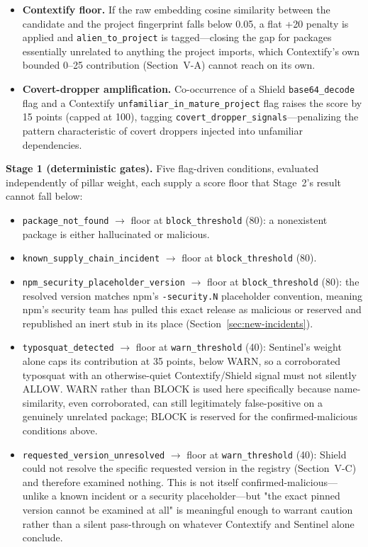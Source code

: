 \documentclass[journal]{IEEEtran}
\begin{document}
\begin{itemize}
\item \textbf{Contextify floor.} If the raw embedding cosine similarity between the candidate and the
project fingerprint falls below 0.05, a flat +20 penalty is applied and \texttt{alien\_to\_project} is
tagged---closing the gap for packages essentially unrelated to anything the project imports, which
Contextify's own bounded 0--25 contribution (Section~V-A) cannot reach on its own.
\item \textbf{Covert-dropper amplification.} Co-occurrence of a Shield \texttt{base64\_decode} flag and a
Contextify \texttt{unfamiliar\_in\_mature\_project} flag raises the score by 15 points (capped at 100),
tagging \texttt{covert\_dropper\_signals}---penalizing the pattern characteristic of covert droppers injected
into unfamiliar dependencies.
\end{itemize}

\textbf{Stage 1 (deterministic gates).} Five flag-driven conditions, evaluated independently of pillar
weight, each supply a score floor that Stage~2's result cannot fall below:

\begin{itemize}
\item \texttt{package\_not\_found} $\rightarrow$ floor at \texttt{block\_threshold} (80): a nonexistent
package is either hallucinated or malicious.
\item \texttt{known\_supply\_chain\_incident} $\rightarrow$ floor at \texttt{block\_threshold} (80).
\item \texttt{npm\_security\_placeholder\_version} $\rightarrow$ floor at \texttt{block\_threshold} (80): the
resolved version matches npm's \texttt{-security.N} placeholder convention, meaning npm's security team has
pulled this exact release as malicious or reserved and republished an inert stub in its place
(Section~\ref{sec:new-incidents}).
\item \texttt{typosquat\_detected} $\rightarrow$ floor at \texttt{warn\_threshold} (40): Sentinel's weight
alone caps its contribution at 35 points, below WARN, so a corroborated typosquat with an otherwise-quiet
Contextify/Shield signal must not silently ALLOW. WARN rather than BLOCK is used here specifically because
name-similarity, even corroborated, can still legitimately false-positive on a genuinely unrelated package;
BLOCK is reserved for the confirmed-malicious conditions above.
\item \texttt{requested\_version\_unresolved} $\rightarrow$ floor at \texttt{warn\_threshold} (40): Shield
could not resolve the specific requested version in the registry (Section~V-C) and therefore examined
nothing. This is not itself confirmed-malicious---unlike a known incident or a security placeholder---but
"the exact pinned version cannot be examined at all" is meaningful enough to warrant caution rather than a
silent pass-through on whatever Contextify and Sentinel alone conclude.
\end{itemize}
\end{document}
